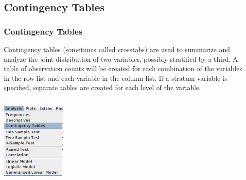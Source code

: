 \documentclass[xcolor={table},c]{beamer}
\begin{document}
\subsection{Contingency Tables}
\begin{frame}\frametitle{Contingency Tables}
Contingency tables (sometimes called crosstabs) are used to summarize and analyze the joint distribution of two variables, possibly stratified by a third. A table of observation counts will be created for each combination of the variables in the row list and each variable in the column list. If a stratum variable is specified, separate tables are created for each level of the variable. 
\begin{columns}
\begin{column}{0.4\textwidth}
\includegraphics[width=3.2cm]{conting1.png}
\end{column}
\begin{column}{0.6\textwidth}
\end{column}
\end{columns}
\end{frame}
\end{document}
